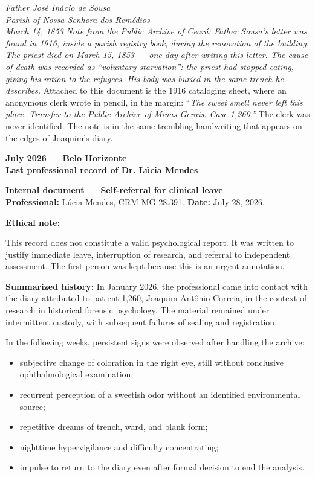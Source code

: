 \noindent \textit{Father José Inácio de Sousa}\\
\noindent \textit{Parish of Nossa Senhora dos Remédios}\\
\noindent \textit{March 14, 1853}
\noindent \textit{Note from the Public Archive of Ceará: Father Sousa's letter was found in 1916, inside a parish registry book, during the renovation of the building. The priest died on March 15, 1853 --- one day after writing this letter. The cause of death was recorded as \textquotedblleft{}voluntary starvation\textquotedblright{}: the priest had stopped eating, giving his ration to the refugees. His body was buried in the same trench he describes.}
\noindent Attached to this document is the 1916 cataloging sheet, where an anonymous clerk wrote in pencil, in the margin: \textquotedblleft{\textit{The sweet smell never left this place. Transfer to the Public Archive of Minas Gerais. Case 1,260.\textquotedblright{}} The clerk was never identified. The note is in the same trembling handwriting that appears on the edges of Joaquim's diary.}




\noindent \textbf{July 2026 --- Belo Horizonte}\\
\noindent \textbf{Last professional record of Dr. Lúcia Mendes}

\noindent \textbf{Internal document --- Self-referral for clinical leave}\\
\noindent \textbf{Professional:} Lúcia Mendes, CRM-MG 28.391. \textbf{Date:} July 28, 2026.

\noindent \textbf{Ethical note:}

\noindent This record does not constitute a valid psychological report. It was written to justify immediate leave, interruption of research, and referral to independent assessment. The first person was kept because this is an urgent annotation.

\noindent \textbf{Summarized history:}
\noindent In January 2026, the professional came into contact with the diary attributed to patient 1,260, Joaquim Antônio Correia, in the context of research in historical forensic psychology. The material remained under intermittent custody, with subsequent failures of sealing and registration.

\noindent In the following weeks, persistent signs were observed after handling the archive:

\begin{itemize}
\item subjective change of coloration in the right eye, still without conclusive ophthalmological examination;
\item recurrent perception of a sweetish odor without an identified environmental source;
\item repetitive dreams of trench, ward, and blank form;
\item nighttime hypervigilance and difficulty concentrating;
\item impulse to return to the diary even after formal decision to end the analysis.
\end{itemize}

